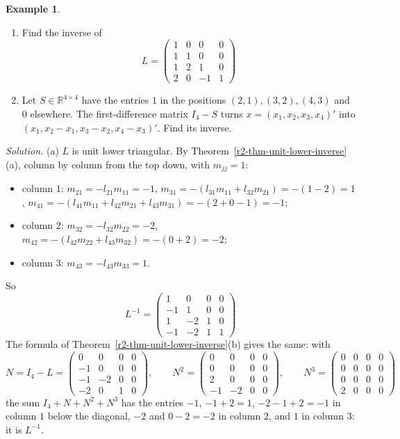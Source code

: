 \documentclass[12pt]{article}
\newcommand{\R}{\mathbb R}
\theoremstyle{definition}
\newtheorem{example}[theorem]{Example}
\begin{document}
\begin{example}\label{r2-exm-unit-lower-inverse}
\begin{enumerate}
\item Find the inverse of
\[
L=\begin{pmatrix}1&0&0&0\\1&1&0&0\\1&2&1&0\\2&0&-1&1\end{pmatrix}
\]
\item Let \(S\in\R^{4\times4}\) have the entries \(1\) in the positions \((2,1),(3,2),(4,3)\) and \(0\) elsewhere. The
first-difference matrix \(I_4-S\) turns \(x=(x_1,x_2,x_3,x_4)'\) into \((x_1,x_2-x_1,x_3-x_2,x_4-x_3)'\). Find its
inverse.
\end{enumerate}

\textit{Solution.}
(a) \(L\) is unit lower triangular. By Theorem~\ref{r2-thm-unit-lower-inverse}(a), column by column from the top down,
with \(m_{jj}=1\):
\begin{itemize}
\item column \(1\): \(m_{21}=-l_{21}m_{11}=-1\), \(m_{31}=-(l_{31}m_{11}+l_{32}m_{21})=-(1-2)=1\),
\(m_{41}=-(l_{41}m_{11}+l_{42}m_{21}+l_{43}m_{31})=-(2+0-1)=-1\);
\item column \(2\): \(m_{32}=-l_{32}m_{22}=-2\), \(m_{42}=-(l_{42}m_{22}+l_{43}m_{32})=-(0+2)=-2\);
\item column \(3\): \(m_{43}=-l_{43}m_{33}=1\).
\end{itemize}
So
\[
L^{-1}=\begin{pmatrix}1&0&0&0\\-1&1&0&0\\1&-2&1&0\\-1&-2&1&1\end{pmatrix}
\]
The formula of Theorem~\ref{r2-thm-unit-lower-inverse}(b) gives the same: with
\[
N=I_4-L=\begin{pmatrix}0&0&0&0\\-1&0&0&0\\-1&-2&0&0\\-2&0&1&0\end{pmatrix},\qquad
N^2=\begin{pmatrix}0&0&0&0\\0&0&0&0\\2&0&0&0\\-1&-2&0&0\end{pmatrix},\qquad
N^3=\begin{pmatrix}0&0&0&0\\0&0&0&0\\0&0&0&0\\2&0&0&0\end{pmatrix}
\]
the sum \(I_4+N+N^2+N^3\) has the entries \(-1\), \(-1+2=1\), \(-2-1+2=-1\) in column \(1\) below the diagonal,
\(-2\) and \(0-2=-2\) in column \(2\), and \(1\) in column \(3\): it is \(L^{-1}\).


\end{example}
\end{document}
